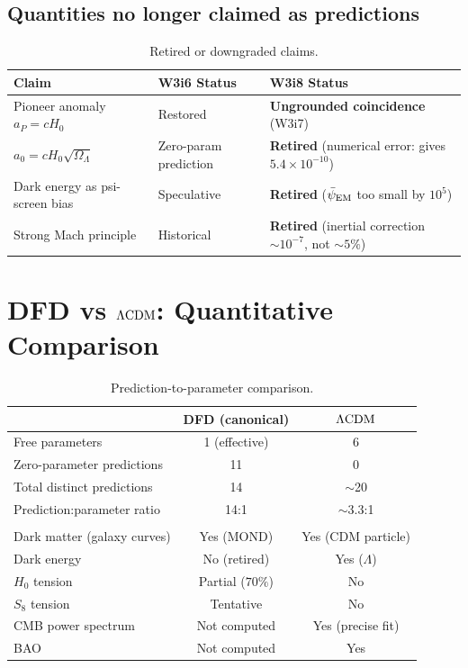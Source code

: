 \documentclass[11pt]{article}
\newcommand{\ee}[1]{\times 10^{#1}}
\newcommand{\psiEM}{\bar{\psi}_{\rm EM}}
\newcommand{\aM}{a_0}
\newcommand{\LCDM}{\Lambda{\rm CDM}}
\newcommand{\Hzero}{H_0}
\newcommand{\OmL}{\Omega_\Lambda}
\begin{document}
\subsection{Quantities no longer claimed as predictions}

\begin{table}[H]
\centering
\caption{Retired or downgraded claims.}
\label{tab:retired}
\begin{tabular}{lll}
\toprule
\textbf{Claim} & \textbf{W3i6 Status} & \textbf{W3i8 Status} \\
\midrule
Pioneer anomaly $a_P = c\Hzero$ & Restored & \textbf{Ungrounded
  coincidence} (W3i7) \\
$\aM = c\Hzero\sqrt{\OmL}$ & Zero-param prediction & \textbf{Retired}
  (numerical error: gives $5.4\ee{-10}$) \\
Dark energy as psi-screen bias & Speculative & \textbf{Retired}
  ($\psiEM$ too small by $10^5$) \\
Strong Mach principle & Historical & \textbf{Retired}
  (inertial correction $\sim 10^{-7}$, not $\sim 5\%$) \\
\bottomrule
\end{tabular}
\end{table}


\section{DFD vs $\LCDM$: Quantitative Comparison}
\label{sec:comparison}

\begin{table}[H]
\centering
\caption{Prediction-to-parameter comparison.}
\label{tab:comparison}
\begin{tabular}{lcc}
\toprule
& \textbf{DFD (canonical)} & \textbf{$\LCDM$} \\
\midrule
Free parameters & 1 (effective) & 6 \\
Zero-parameter predictions & 11 & 0 \\
Total distinct predictions & 14 & $\sim$20 \\
Prediction:parameter ratio & 14:1 & $\sim$3.3:1 \\
\addlinespace
\multicolumn{3}{l}{\textit{Qualitative features explained:}} \\
Dark matter (galaxy curves) & Yes (MOND) & Yes (CDM particle) \\
Dark energy & No (retired) & Yes ($\Lambda$) \\
$H_0$ tension & Partial ($70\%$) & No \\
$S_8$ tension & Tentative & No \\
CMB power spectrum & Not computed & Yes (precise fit) \\
BAO & Not computed & Yes \\
\bottomrule
\end{tabular}
\end{table}
\end{document}
